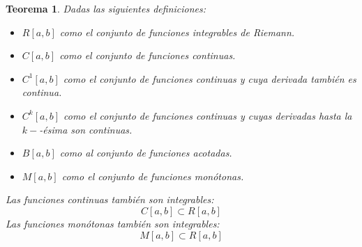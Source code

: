\documentclass[10pt,a4paper,openright]{book}
\theoremstyle{break}
\newtheorem*{theo}{Teorema}
\begin{document}
\begin{theo}
Dadas las siguientes definiciones:
\begin{itemize}
\item $R[a,b]$ como el conjunto de funciones integrables de Riemann.
\item $C[a,b]$ como el conjunto de funciones continuas.
\item $C^{1}[a,b]$ como el conjunto de funciones continuas y cuya derivada también es continua.
\item $C^{k}[a,b]$ como el conjunto de funciones continuas y cuyas derivadas hasta la $k-$-ésima son continuas.
\item $B[a,b]$ como al conjunto de funciones acotadas.
\item $M[a,b]$ como el conjunto de funciones monótonas.
\end{itemize}
Las funciones continuas también son integrables:
$$C[a,b]\subset R[a,b]$$
Las funciones monótonas también son integrables:
$$M[a,b]\subset R[a,b]$$
\end{theo}
\end{document}
